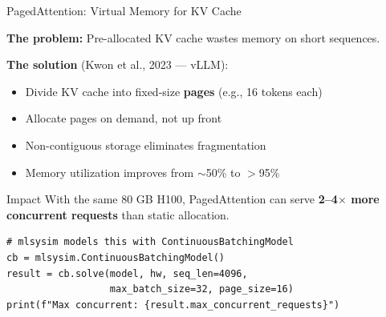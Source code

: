 \documentclass[aspectratio=169, 12pt]{beamer}
\begin{document}
\begin{frame}[fragile]{PagedAttention: Virtual Memory for KV Cache}

\small
\textbf{The problem:} Pre-allocated KV cache wastes memory on short sequences.

\textbf{The solution} (Kwon et al., 2023 --- vLLM):
\begin{itemize}
  \item Divide KV cache into fixed-size \textbf{pages} (e.g., 16 tokens each)
  \item Allocate pages on demand, not up front
  \item Non-contiguous storage eliminates fragmentation
  \item Memory utilization improves from $\sim$50\% to $>$95\%
\end{itemize}

\vspace{0.2cm}
\begin{exampleblock}{Impact}
  With the same 80 GB H100, PagedAttention can serve
  \textbf{2--4$\times$ more concurrent requests} than static allocation.
\end{exampleblock}

\vspace{0.2cm}
\begin{lstlisting}
# mlsysim models this with ContinuousBatchingModel
cb = mlsysim.ContinuousBatchingModel()
result = cb.solve(model, hw, seq_len=4096,
                  max_batch_size=32, page_size=16)
print(f"Max concurrent: {result.max_concurrent_requests}")
\end{lstlisting}
\end{frame}
\end{document}
